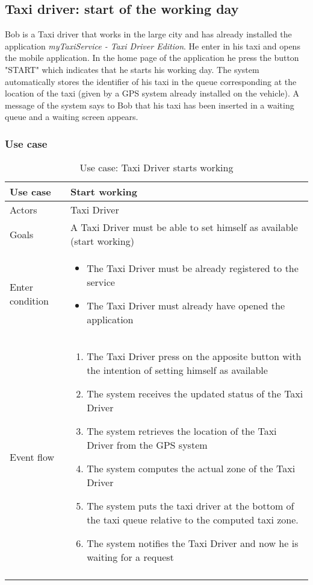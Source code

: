 \subsection{Taxi driver: start of the working day}
Bob is a Taxi driver that works in the large city and has already installed the application \textit{myTaxiService - Taxi Driver Edition}.
He enter in his taxi and opens the mobile application. In the home page of the application he press the button "START" which indicates that he starts his working day. The system automatically stores the identifier of his taxi in the queue corresponding at the location of the taxi (given by a GPS system already installed on the vehicle).
A message of the system says to Bob that his taxi has been inserted in a waiting queue and a waiting screen appears.

\subsubsection{Use case}
\begin{center}
\begin{longtable}{| p{} | p{} |} \hline
	Use case & \textbf{Start working} \\ \hline 
	Actors & Taxi Driver \\ \hline
	Goals & A Taxi Driver must be able to set himself as available (start working)  \\ \hline
	Enter condition & \begin{itemize}
						\item The Taxi Driver must be already registered to the service
						\item The Taxi Driver must already have opened the application
						\end{itemize} \\ \hline
	Event flow & \begin{enumerate}
					\item The Taxi Driver press on the apposite button with the intention of setting himself as available
					\item The system receives the updated status of the Taxi Driver
					\item The system retrieves the location of the Taxi Driver from the GPS system
					\item The system computes the actual zone of the Taxi Driver
					\item The system puts the taxi driver at the bottom of the taxi queue relative to the computed taxi zone.
					\item The system notifies the Taxi Driver and now he is waiting for a request
				\end{enumerate} \\ \hline
	\caption{Use case: Taxi Driver starts working}
\end{longtable}
\end{center}